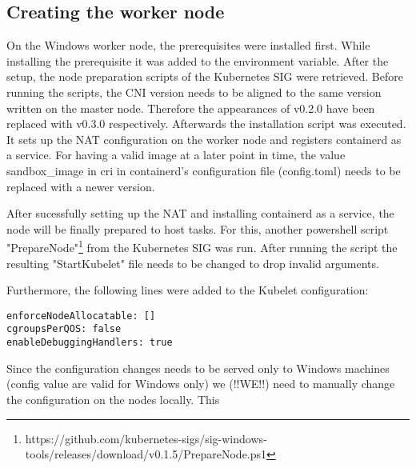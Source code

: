 \subsection{Creating the worker node}
On the Windows worker node, the prerequisites were installed first. While installing the prerequisite  it was added to the  environment variable. After the setup, the node preparation scripts of the Kubernetes \ac{SIG} were retrieved. Before running the scripts, the \ac{CNI} version needs to be aligned to the same version written on the master node. Therefore the appearances of v0.2.0 have been replaced with v0.3.0 respectively.
Afterwards the installation script was executed. It sets up the \ac{NAT} configuration on the worker node and registers containerd as a service.
For having a valid image at a later point in time, the value sandbox\_image in cri in containerd's configuration file (config.toml) needs to be replaced with a newer version.

After sucessfully setting up the \ac{NAT} and installing containerd as a service, the node will be finally prepared to host tasks. For this, another powershell script "PrepareNode"\footnote{https://github.com/kubernetes-sigs/sig-windows-tools/releases/download/v0.1.5/PrepareNode.ps1} from the Kubernetes \ac{SIG} was run. After running the script the resulting "StartKubelet" file needs to be changed to drop invalid arguments.

Furthermore, the following lines were added to the Kubelet configuration:
\begin{lstlisting}
enforceNodeAllocatable: []
cgroupsPerQOS: false
enableDebuggingHandlers: true
\end{lstlisting}
Since the configuration changes needs to be served only to Windows machines (config value are valid for Windows only) we (!!WE!!) need to manually change the configuration on the nodes locally. This


